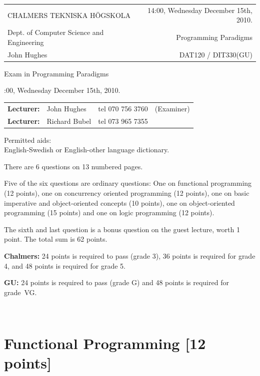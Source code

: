 \documentclass{article}
\begin{document}
\newcommand{\examtime}{14:00, Wednesday December 15th, 2010}
\newcommand{\points}[1]{\marginpar{\bf #1 points}}
\noindent
\begin{tabular}{lr}
CHALMERS TEKNISKA H\"OGSKOLA &\examtime{}.\\
Dept. of Computer Science and Engineering & Programming Paradigms\\
John Hughes                  & DAT120 / DIT330(GU) \\
\end{tabular}

\vspace{2.5cm} \noindent
\begin{center} {\LARGE
Exam in Programming Paradigms}
\end{center}

\vspace{1.5cm}

\noindent
\examtime{}.\\
\begin{tabular}{lllc}
\textbf{Lecturer:} &  John Hughes  & tel 070 756 3760 & (Examiner)\\
\textbf{Lecturer:} & Richard Bubel & tel 073 965 7355 & \\ 
\end{tabular}
\vspace{1cm}

\noindent
Permitted aids:\\
English-Swedish or English-other language dictionary.

There are 6 questions on 13 numbered pages. 

Five of the six questions are ordinary questions: One on functional
programming (12 points), one on concurrency oriented programming (12
points), one on basic imperative and object-oriented concepts (10
points), one on object-oriented programming (15 points) and one on
logic programming (12 points).

The sixth and last question is a bonus question on the guest lecture,
worth 1 point. The total sum is 62 points.


\textbf{Chalmers:}
24 points is required to pass (grade 3), 36 points is required for
grade 4, and 48 points is required for grade 5. 

\textbf{GU:}
24 points is required to pass (grade G) and 48 points is required for
grade~VG.


\newpage 
\hfill\\
\newpage

\section{Functional Programming [12 points]}
\end{document}
